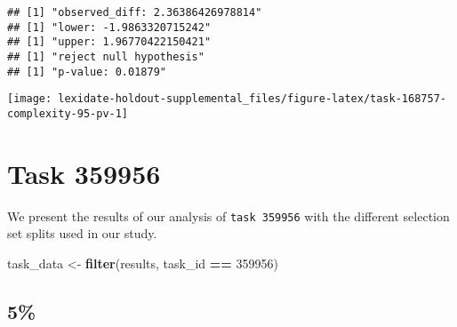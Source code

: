 \documentclass[
]{book}
\newenvironment{Shaded}{\begin{snugshade}}{\end{snugshade}}
\newcommand{\AttributeTok}[1]{\textcolor[rgb]{0.13,0.29,0.53}{#1}}
\newcommand{\DecValTok}[1]{\textcolor[rgb]{0.00,0.00,0.81}{#1}}
\newcommand{\FunctionTok}[1]{\textcolor[rgb]{0.13,0.29,0.53}{\textbf{#1}}}
\newcommand{\NormalTok}[1]{#1}
\newcommand{\OtherTok}[1]{\textcolor[rgb]{0.56,0.35,0.01}{#1}}
\newcommand{\SpecialCharTok}[1]{\textcolor[rgb]{0.81,0.36,0.00}{\textbf{#1}}}
\newcommand{\StringTok}[1]{\textcolor[rgb]{0.31,0.60,0.02}{#1}}
\begin{document}
\begin{Shaded}
\end{Shaded}

\begin{verbatim}
## [1] "observed_diff: 2.36386426978814"
## [1] "lower: -1.9863320715242"
## [1] "upper: 1.96770422150421"
## [1] "reject null hypothesis"
## [1] "p-value: 0.01879"
\end{verbatim}

\texttt{[image: lexidate-holdout-supplemental\_files/figure-latex/task-168757-complexity-95-pv-1]}

\hypertarget{task-359956}{%
\chapter{Task 359956}\label{task-359956}}

We present the results of our analysis of \texttt{task\ 359956} with the different selection set splits used in our study.

\begin{Shaded}
\begin{Highlighting}[]
\NormalTok{task\_data }\OtherTok{\textless{}{-}} \FunctionTok{filter}\NormalTok{(results, task\_id }\SpecialCharTok{==} \DecValTok{359956}\NormalTok{)}
\end{Highlighting}
\end{Shaded}

\hypertarget{section-25}{%
\section{5\%}\label{section-25}}
\end{document}
